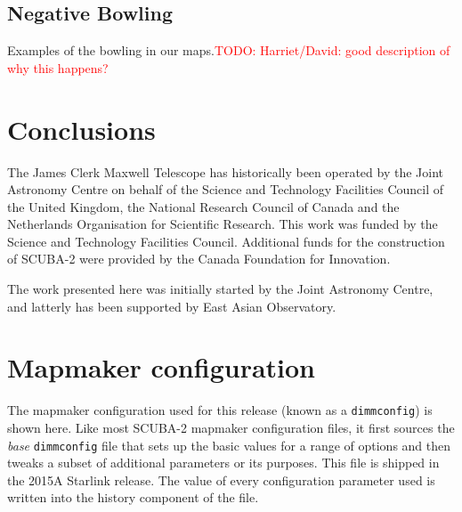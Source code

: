 \documentclass[twocolumn]{aastex6}
\newcommand{\todo}[1]{\textcolor{red}{TODO: #1}}
\begin{document}
\subsection{Negative Bowling}
Examples of the bowling in our maps.\todo{Harriet/David: good description of why this happens?}





\section{Conclusions}

\acknowledgments

The James Clerk Maxwell Telescope has historically been operated by
the Joint Astronomy Centre on behalf of the Science and Technology
Facilities Council of the United Kingdom, the National Research
Council of Canada and the Netherlands Organisation for Scientific
Research. This work was funded by the Science and Technology
Facilities Council.  Additional funds for the construction of SCUBA-2
were provided by the Canada Foundation for Innovation.

The work presented here was initially started by the Joint Astronomy
Centre, and latterly has been supported by East Asian Observatory.


\vspace{5mm}






\appendix


\section{Mapmaker configuration}
\label{app:config}
The mapmaker configuration used for this release (known as a
\texttt{dimmconfig}) is shown here. Like most SCUBA-2 mapmaker
configuration files, it first sources the \emph{base}
\texttt{dimmconfig} file that sets up the basic values for a range of
options and then tweaks a subset of additional parameters or its
purposes. This file is shipped in the 2015A Starlink release. The
value of every configuration parameter used is written into the
history component of the file.
\end{document}
